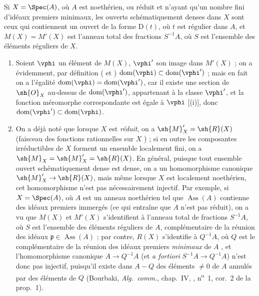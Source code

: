 \begin{corollary}[20.2.12]
\label{IV.20.2.12}
Si $X=\Spec(A)$, où $A$ est noethérien, ou réduit et n'ayant qu'un nombre fini d'idéaux premiers minimaux, les ouverts schématiquement denses dans $X$ sont ceux qui contiennent un ouvert de la forme $\mathrm{D}(t)$, où $t$ est régulier dans $A$, et $M(X)=M'(X)$ est l'anneau total des fractions $S^{-1}A$, où $S$ est l'ensemble des éléments réguliers de $X$.
\end{corollary}

\begin{remarks}[20.2.13]
\label{IV.20.2.13}
\begin{enumerate}[label=(\roman*)]
  \item Soient $\vphi$ un élément de $M(X)$, $\vphi'$ son image dans $M'(X)$ ; on a évidemment, par définition ( et ) $\operatorname{dom}(\vphi)\subset\operatorname{dom}(\vphi')$ ; mais en fait on a l'égalité $\operatorname{dom}(\vphi)=\operatorname{dom}(\vphi')$, car il existe une section de $\sh{O}_X$ au-dessus de $\operatorname{dom}(\vphi')$, appartenant à la classe $\vphi'$, et la fonction méromorphe correspondante est égale à $\vphi$ [(i)], donc $\operatorname{dom}(\vphi')\subset\operatorname{dom}(\vphi)$.

  \item On a déjà noté que lorsque $X$ est \emph{réduit}, on a $\sh{M}'_X=\sh{R}(X)$ (faisceau des fonctions rationnelles sur $X$ ) ; si en outre les composantes irréductibles de $X$ forment un ensemble localement fini, on a $\sh{M}_X=\sh{M}'_X=\sh{R}(X)$.
  En général, puisque tout ensemble ouvert schématiquement dense est dense, on a un homomorphisme canonique $\sh{M}'_X\to\sh{R}(X)$, mais même lorsque $X$ est localement noethérien, cet homomorphisme n'est pas nécessairement injectif.
  Par exemple, si $X=\Spec(A)$, où $A$ est un anneau noethérien tel que $\operatorname{Ass}(A)$ contienne des idéaux premiers immergés (ce qui entraîne que $A$ n'est pas réduit), on a vu que $M(X)$ et $M'(X)$ s'identifient à l'anneau total de fractions $S^{-1}A$,
  où $S$ est l'ensemble des éléments réguliers de $A$, complémentaire de la réunion des idéaux $\mathfrak{p}\in\operatorname{Ass}(A)$ ; par contre, $R(X)$ s'identifie à $Q^{-1}A$, où $Q$ est le complémentaire de la réunion des idéaux premiers \emph{minimaux} de $A$ , et l'homomorphisme canonique $A\to Q^{-1}A$ (et \emph{a fortiori} $S^{-1}A\to Q^{-1}A$) n'est donc pas injectif, puisqu'il existe dans $A-Q$ des éléments $\neq0$ de $A$ annulés par des éléments de $Q$ (Bourbaki, \emph{Alg.~comm.}, chap.~IV, , n\textsuperscript{o}~1, cor.~2 de la prop.~1).


\end{enumerate}
\end{remarks}
